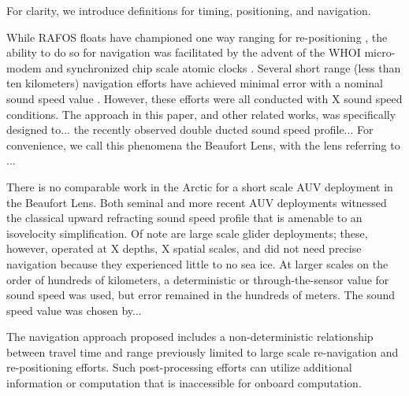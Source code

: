 
For clarity, we introduce definitions for timing, positioning, and navigation. 

While RAFOS floats have championed one way ranging for re-positioning \citep{rossby_rafos_1986,duda_evaluation_2006}, the ability to do so for navigation was facilitated by  the advent of the WHOI micro-modem \citep{singh_underwater_2006} and synchronized chip scale atomic clocks \citep{gardner_second_2016}.
Several short range (less than ten kilometers) navigation efforts have achieved minimal error with a nominal sound speed value \citep{eustice_experimental_2007,webster_preliminary_2009,kepper_mems_2017}.
However, these efforts were all conducted with X sound speed conditions.
The approach in this paper, and other related works, was specifically designed to... the recently observed double ducted sound speed profile...
For convenience, we call this phenomena the Beaufort Lens, with the lens referring to ... 

There is no comparable work in the Arctic for a short scale AUV deployment in the Beaufort Lens. 
Both seminal and more recent AUV deployments witnessed the classical upward refracting sound speed profile that is amenable to an isovelocity simplification.
Of note are large scale glider deployments; these, however, operated at X depths, X spatial scales, and did not need precise navigation because they experienced little to no sea ice.
At larger scales on the order of hundreds of kilometers, a deterministic \citep{graupe_preliminary_2019} or through-the-sensor \citep{webster_towards_2015} value for sound speed was used, but error remained in the hundreds of meters.
The sound speed value was chosen by...

The navigation approach proposed includes a non-deterministic relationship between travel time and range previously limited to large scale re-navigation and re-positioning efforts.
Such post-processing efforts can utilize additional information or computation that is inaccessible for onboard computation.

